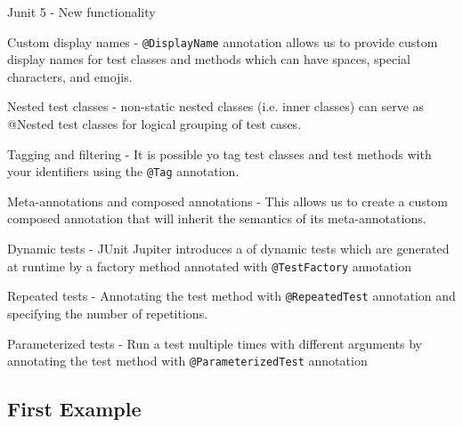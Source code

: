 \documentclass[11pt, xcolor=svgnames]{beamer}
\begin{document}
\begin{frame}{Junit 5 - New functionality}

  Custom display names - \texttt{@DisplayName} annotation allows us to provide custom display names for test classes and methods which can have spaces, special characters, and emojis.

  Nested test classes - non-static nested classes (i.e. inner classes) can serve as @Nested test classes for logical grouping of test cases. 

  Tagging and filtering - It is possible yo tag test classes and test methods with your  identifiers using the \texttt{@Tag} annotation. 

  Meta-annotations and composed annotations - This allows us to create a custom composed annotation that will inherit the semantics of its meta-annotations.

  Dynamic tests - JUnit Jupiter introduces a of dynamic tests which are generated at runtime by a factory method annotated with \texttt{@TestFactory} annotation

  Repeated tests - Annotating the test method with \texttt{@RepeatedTest} annotation and specifying the number of repetitions.

  Parameterized tests - Run a test multiple times with different arguments by annotating the test method with \texttt{@ParameterizedTest} annotation 

\end{frame}


\subsection{First Example}

\end{document}
